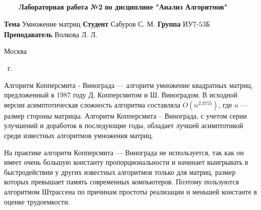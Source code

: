 \begin{center}
	\noindent\begin{minipage}{1.3\textwidth}\centering
	\Large\textbf{   ~~~ Лабораторная работа №2}\newline
	\textbf{по дисциплине "Анализ Алгоритмов"}\newline\newline\newline
	\end{minipage}
\end{center}

\noindent\textbf{Тема} $\underline{\text{Умножение матриц}}$\newline\newline
\noindent\textbf{Студент} $\underline{\text{Сабуров С. М.}}$\newline\newline
\noindent\textbf{Группа} $\underline{\text{ИУ7-53Б}}$\newline\newline
\noindent\textbf{Преподаватель} $\underline{\text{Волкова Л. Л.}}$\newline

\begin{center}
	\mbox{}
	\vfill
	Москва
\end{center}

\begin{center}
	\the\year ~г.
\end{center}
\clearpage

\renewcommand\contentsname{\hfill{\normalfont{СОДЕРЖАНИЕ}}\hfill}  %
\tableofcontents
\newpage


Алгоритм Копперсмита - Винограда --- алгоритм умножение квадратных матриц, предложенный в 1987 году Д. Копперсмитом и Ш. Виноградом. В исходной версии асимптотическая сложность алгоритма составляла $O(n^{2.3755})$, где $n$ --- размер стороны матрицы. Алгоритм Копперсмита -- Винограда, с учетом серии улучшений и доработок в последующие годы, обладает лучшей асимптотикой среди известных алгоритмов умножения матриц.

На практике алгоритм Копперсмита — Винограда не используется, так как он имеет очень большую константу пропорциональности и начинает выигрывать в быстродействии у других известных алгоритмов только для матриц, размер которых превышает память современных компьютеров. Поэтому пользуются алгоритмом Штрассена по причинам простоты реализации и меньшей константе в оценке трудоемкости.



